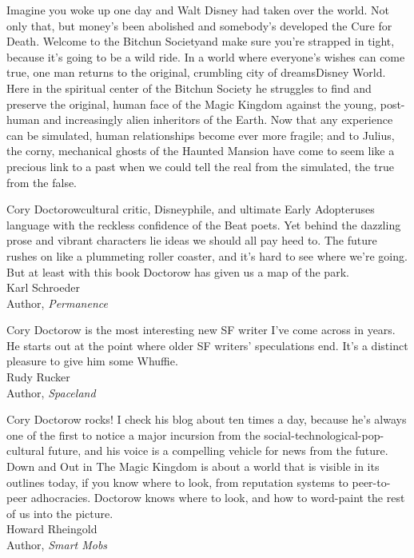 {\bigskip

Imagine you woke up one day and Walt Disney had taken over the
world. Not only that, but money's been abolished and somebody's
developed the Cure for Death. Welcome to the Bitchun Society{\dash}and
make sure you're strapped in tight, because it's going to be a wild
ride. In a world where everyone's wishes can come true, one man
returns to the original, crumbling city of dreams{\dash}Disney World.
Here in the spiritual center of the Bitchun Society he struggles to
find and preserve the original, human face of the Magic Kingdom
against the young, post-human and increasingly alien inheritors of
the Earth. Now that any experience can be simulated, human
relationships become ever more fragile; and to Julius, the corny,
mechanical ghosts of the Haunted Mansion have come to seem like a
precious link to a past when we could tell the real from the
simulated, the true from the false.

\quad Cory Doctorow{\dash}cultural critic, Disneyphile, and ultimate Early
Adopter{\dash}uses language with the reckless confidence of the Beat
poets. Yet behind the dazzling prose and vibrant characters lie
ideas we should all pay heed to. The future rushes on like a
plummeting roller coaster, and it's hard to see where we're going.
But at least with this book Doctorow has given us a map of the
park.
\\
\hspace*{\fill}Karl Schroeder
\\
\hspace*{\fill}Author, \emph{Permanence}

\bigskip

Cory Doctorow is the most interesting new SF writer I've come
across in years. He starts out at the point where older SF writers'
speculations end. It's a distinct pleasure to give him some
Whuffie.
\\
\hspace*{\fill}Rudy Rucker
\\
\hspace*{\fill}Author, \emph{Spaceland}

\bigskip

Cory Doctorow rocks! I check his blog about ten times a day,
because he's always one of the first to notice a major incursion
from the social-technological-pop-cultural future, and his voice is
a compelling vehicle for news from the future. Down and Out in The
Magic Kingdom is about a world that is visible in its outlines
today, if you know where to look, from reputation systems to
peer-to-peer adhocracies. Doctorow knows where to look, and how to
word-paint the rest of us into the picture.
\\
\hspace*{\fill}Howard Rheingold
\\
\hspace*{\fill}Author, \emph{Smart Mobs}

}
